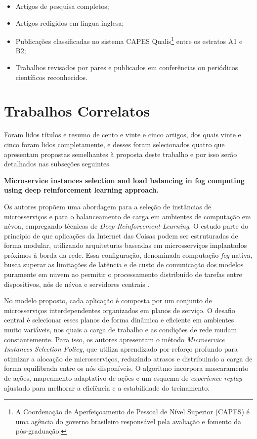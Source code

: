 \begin{itemize}
    \item Artigos de pesquisa completos;
    \item Artigos redigidos em língua inglesa;
    \item Publicações classificadas no sistema \gls{CAPES} Qualis\footnote{A Coordenação de Aperfeiçoamento de Pessoal de Nível Superior (\gls{CAPES}) é uma agência do governo brasileiro responsável pela avaliação e fomento da pós-graduação.} entre os estratos A1 e B2;
    \item Trabalhos revisados por pares e publicados em conferências ou periódicos científicos reconhecidos.
\end{itemize}

\section{Trabalhos Correlatos}\label{cap:trabalhos_relacionados}

Foram lidos títulos e resumo de cento e vinte e cinco artigos, dos quais vinte e cinco foram lidos completamente, e desses foram selecionados quatro que apresentam propostas semelhantes à proposta deste trabalho e por isso serão detalhados nas subseções seguintes.

\textbf{Microservice instances selection and load balancing in fog computing using deep reinforcement learning approach.}

Os autores propõem uma abordagem para a seleção de instâncias de microsserviços e para o balanceamento de carga em ambientes de computação em névoa, empregando técnicas de \textit{Deep Reinforcement Learning}. O estudo parte do princípio de que aplicações da Internet das Coisas podem ser estruturadas de forma modular, utilizando arquiteturas baseadas em microsserviços implantados próximos à borda da rede. Essa configuração, denominada computação \textit{fog} nativa, busca superar as limitações de latência e de custo de comunicação dos modelos puramente em nuvem ao permitir o processamento distribuído de tarefas entre dispositivos, nós de névoa e servidores centrais \cite{boudieb2024}.

No modelo proposto, cada aplicação é composta por um conjunto de microsserviços interdependentes organizados em planos de serviço. O desafio central é selecionar esses planos de forma dinâmica e eficiente em ambientes muito variáveis, nos quais a carga de trabalho e as condições de rede mudam constantemente. Para isso, os autores apresentam o método \textit{Microservice Instances Selection Policy}, que utiliza aprendizado por reforço profundo para otimizar a alocação de microsserviços, reduzindo atrasos e distribuindo a carga de forma equilibrada entre os nós disponíveis. O algoritmo incorpora mascaramento de ações, mapeamento adaptativo de ações e um esquema de \textit{experience replay} ajustado para melhorar a eficiência e a estabilidade do treinamento.

